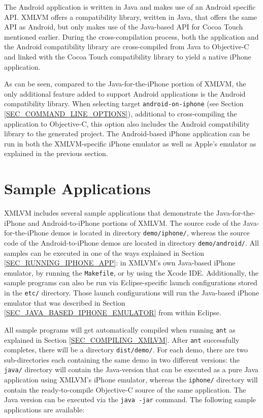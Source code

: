 \documentclass[11pt]{book}
\begin{document}
The Android application is written in Java and makes use of an Android
specific API. XMLVM offers a compatibility library, written in Java,
that offers the same API as Android, but only makes use of the
Java-based API for Cocoa Touch mentioned earlier. During the
cross-compilation process, both the application and the Android
compatibility library are cross-compiled from Java to Objective-C and
linked with the Cocoa Touch compatibility library to yield a native
iPhone application.

As can be seen, compared to the Java-for-the-iPhone portion of XMLVM,
the only additional feature added to support Android applications is
the Android compatibility library. When selecting target
\texttt{android-on-iphone} (see Section
\ref{SEC_COMMAND_LINE_OPTIONS}), additional to cross-compiling the
application to Objective-C, this option also includes the Android
compatibility library to the generated project.  The Android-based
iPhone application can be run in both the XMLVM-specific iPhone
emulator as well as Apple's emulator as explained in the previous
section.


\section{Sample Applications}
\label{SEC_IPHONE_SAMPLE_APPS}

XMLVM includes several sample applications that demonstrate the
Java-for-the-iPhone and Android-to-iPhone portions of XMLVM. The
source code of the Java-for-the-iPhone demos is located in directory
\texttt{demo/iphone/}, whereas the source code of the
Android-to-iPhone demos are located in directory
\texttt{demo/android/}. All samples can be executed in one of the ways
explained in Section \ref{SEC_RUNNING_IPHONE_APP}: in XMLVM's own
Java-based iPhone emulator, by running the \texttt{Makefile}, or by
using the Xcode IDE. Additionally, the sample programs can also be run
via Eclipse-specific launch configurations stored in the \texttt{etc/}
directory. Those launch configurations will run the Java-based iPhone
emulator that was described in Section
\ref{SEC_JAVA_BASED_IPHONE_EMULATOR} from within Eclipse.

All sample programs will get automatically compiled when running
\texttt{ant} as explained in Section \ref{SEC_COMPILING_XMLVM}. After
\texttt{ant} successfully completes, there will be a directory
\texttt{dist/demo/}.  For each demo, there are two sub-directories
each containing the same demo in two different versions: the
\texttt{java/} directory will contain the Java-version that can be
executed as a pure Java application using XMLVM's iPhone emulator,
whereas the \texttt{iphone/} directory will contain the
ready-to-compile Objective-C source of the same application. The Java
version can be executed via the \texttt{java -jar} command. The
following sample applications are available:
\end{document}
